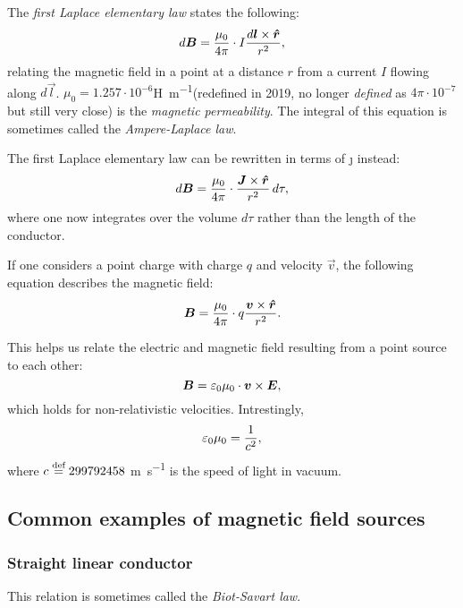     The \textit{first Laplace elementary law} states the following:
    \begin{equation}
        d\B = \frac{\mu_0}{4\pi}\cdot I\frac{d\vec{l}\times\hat{r}}{r^2},
    \end{equation}
    relating the magnetic field in a point at a distance $r$ from a current $I$ flowing along $d\vec{l}$.
    $\mu_0 = 1.257\cdot 10^{-6}$\si{\henry\per\metre}(redefined in 2019, 
    no longer \textit{defined} as $4\pi\cdot10^{-7}$ but still very close) is the \textit{magnetic permeability}. 
    The integral of this equation is sometimes called the \textit{Ampere-Laplace law}.

    The first Laplace elementary law can be rewritten in terms of \j{} instead:
    \begin{equation}
        d\B = \frac{\mu_0}{4\pi}\cdot \frac{\j\times\hat{r}}{r^2}\,d\tau,
    \end{equation}
    where one now integrates over the volume $d\tau$ rather than the length of the conductor.

    If one considers a point charge with charge $q$ and velocity $\vec{v}$, 
    the following equation describes the magnetic field:
    \begin{equation}
        \B = \frac{\mu_0}{4\pi}\cdot q\frac{\vec{v}\times\hat{r}}{r^2}.
    \end{equation}

    This helps us relate the electric and magnetic field resulting from a point source to each other:
    \begin{equation}
        \bm{B} = \varepsilon_0 \mu_0 \cdot\bm{v}\times\bm{E},
    \end{equation}
    which holds for non-relativistic velocities. Intrestingly,
    \begin{equation}
        \varepsilon_0\mu_0 = \frac{1}{c^2},
    \end{equation}
    where $c \stackrel{\text{def}}{=} 299792458$ \si{\metre\per\second} is the speed of light in vacuum. 

\subsection{Common examples of magnetic field sources}
    \subsubsection*{Straight linear conductor}
        This relation is sometimes called the \textit{Biot-Savart law}.

